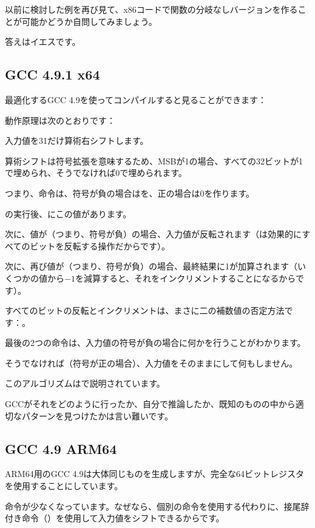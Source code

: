 \label{chap:branchless_abs}

以前に検討した例を再び見て、x86コードで関数の分岐なしバージョンを作ることが可能かどうか自問してみましょう。



答えはイエスです。

\subsection{\Optimizing GCC 4.9.1 x64}

最適化するGCC 4.9を使ってコンパイルすると見ることができます：



動作原理は次のとおりです：

入力値を31だけ算術右シフトします。

算術シフトは符号拡張を意味するため、\ac{MSB}が1の場合、すべての32ビットが1で埋められ、そうでなければ0で埋められます。

つまり、命令は、符号が負の場合はを、正の場合は0を作ります。

の実行後、\EDX にこの値があります。

次に、値が（つまり、符号が負）の場合、入力値が反転されます（は効果的にすべてのビットを反転する操作だからです）。

次に、再び値が（つまり、符号が負）の場合、最終結果に1が加算されます（いくつかの値から$-1$を減算すると、それをインクリメントすることになるからです）。

すべてのビットの反転とインクリメントは、まさに二の補数値の否定方法です：。

最後の2つの命令は、入力値の符号が負の場合に何かを行うことがわかります。

そうでなければ（符号が正の場合）、入力値をそのままにして何もしません。

このアルゴリズムはで説明されています。

GCCがそれをどのように行ったか、自分で推論したか、既知のものの中から適切なパターンを見つけたかは言い難いです。

\subsection{\Optimizing GCC 4.9 ARM64}

ARM64用のGCC 4.9は大体同じものを生成しますが、完全な64ビットレジスタを使用することにしています。

命令が少なくなっています。なぜなら、個別の命令を使用する代わりに、接尾辞付き命令（）を使用して入力値をシフトできるからです。

